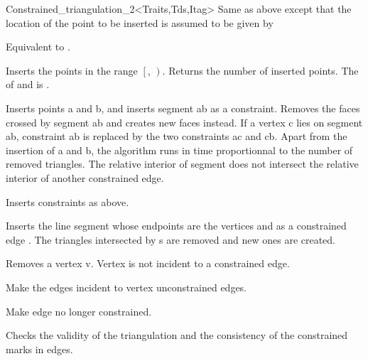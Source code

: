 \begin{ccRefClass}{Constrained_triangulation_2<Traits,Tds,Itag>}
{Same as above except that the location of the point
  to be inserted is assumed to be given by
}

{Equivalent to .}

{Inserts the points in the range
 $\left[\right.$, $\left.\right)$.
 Returns the number of inserted points.
 \ccPrecond The  of  and 
 is .}

{ Inserts points a and b, and inserts segment ab as a
constraint. Removes the faces crossed by segment ab and creates new
faces instead. If a vertex c lies on segment ab, constraint ab is
replaced by the two constraints ac and cb. Apart from the insertion of
a and b, the algorithm runs in time proportionnal to the number of
removed triangles. 
\ccPrecond The relative interior of segment  does not
intersect the relative interior of another constrained edge.}

{Inserts constraints  as above.}

{ Inserts the line segment  whose endpoints are the vertices 
 and
  as a constrained edge . The triangles intersected by s
are removed and new ones are created.}


{ Removes a vertex v. 
\ccPrecond Vertex   is not incident to a constrained edge.}

{Make the edges incident to vertex  unconstrained edges.}

{ Make edge   no longer constrained.}

\begin{ccAdvanced}
{Checks the validity of the triangulation and
the consistency of the constrained marks in edges.}

\end{ccAdvanced}



\end{ccRefClass}
